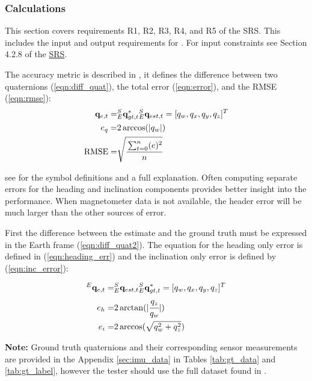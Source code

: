 \documentclass[12pt, titlepage]{article}
\begin{document}
\subsubsection{Calculations} \label{sec:calc} This section covers requirements R1, R2, R3, R4, and
R5 of the SRS. This includes the input and output requirements for \progname{}. For input
constraints see Section 4.2.8 of the
\href{https://github.com/adrian-soch/attitude_check/blob/main/docs/SRS/SRS.pdf}{SRS}.

The accuracy metric is described in \cite{broad}, it defines the difference between two quaternions
(\ref{eqn:diff_quat}), the total error (\ref{eqn:error}), and the RMSE (\ref{eqn:rmse}):
\begin{align}
    \mathbf{q}_{e, t} =& {}^S_E\mathbf{q}^{*}_{gt, t}  {}^S_E\mathbf{q}_{est, t} = [q_w, q_x, q_y, q_z]^T \label{eqn:diff_quat} \\
    e_q =& 2 \arccos(|q_w|)  \label{eqn:error}\\
    \text{RMSE} =& \sqrt{\cfrac{\sum_{t=0}^n(e)^2}{n}}  \label{eqn:rmse}
\end{align}

see \cite{broad} for the symbol definitions and a full explanation. Often computing separate errors
for the heading and inclination components provides better insight into the performance. When
magnetometer data is not available, the header error will be much larger than the other sources of
error.

First the difference between the estimate and the ground truth must be expressed in the Earth frame
(\ref{eqn:diff_quat2}). The equation for the heading only error is defined in
(\ref{eqn:heading_err}) and the inclination only error is defined by (\ref{eqn:inc_error}):

\begin{align}
    {}^E \mathbf{q}_{e,t} =& {}^S_E\mathbf{q}_{est, t} {}^S_E\mathbf{q}^{*}_{gt, t} = [q_w, q_x, q_y, q_z]^T \label{eqn:diff_quat2} \\
    e_{h} =& 2 \arctan(|\cfrac{q_z}{q_w}|) \label{eqn:heading_err} \\
    e_{i} =&  2 \arccos(\sqrt{q_w^2 + q_z^2}) \label{eqn:inc_error}
\end{align}

\textbf{Note:} Ground truth quaternions and their corresponding sensor measurements are provided in
the Appendix \ref{sec:imu_data} in Tables \ref{tab:gt_data} and \ref{tab:gt_label}, however the
tester should use the full dataset found in \citep{broad_code}.
\end{document}
